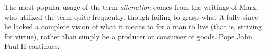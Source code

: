 \documentclass[letterpaper]{article}
\begin{document}

The most popular usage of the term \textit{alienation} comes from the writings of Marx, who utilized the term quite frequently, though failing to grasp what it fully since he lacked a complete vision of what it means to for a man to live (that is, striving for virtue), rather than simply be a producer or consumer of goods. Pope John Paul II continues:
\end{document}
